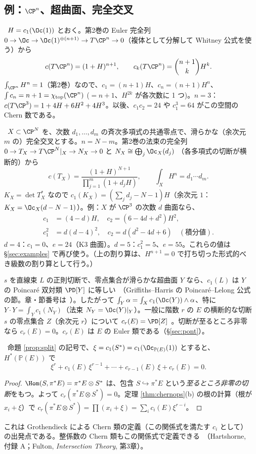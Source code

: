 \subsection{例：$\CP^n$、超曲面、完全交叉}
\begin{ex}[$\CP^n$]\label{ex:chernPn}\tP\
$H=c_1(\Oc(1))$ とおく。第2巻の Euler 完全列 $0\to\Oc\to\Oc(1)^{\oplus(n+1)}\to T\CP^n\to0$（複体として分解して Whitney 公式を使う）から
\[
c(T\CP^n)=(1+H)^{n+1},\qquad c_k(T\CP^n)=\binom{n+1}{k}H^k.
\]
$\int_{\CP^n}H^n=1$（第2巻）なので、$c_1=(n+1)H$、$c_n=(n+1)H^n$、$\int c_n=n+1=\chi_{\rm top}(\CP^n)$ ($=n+1$、$H^{2k}$ が各次数に 1 つ)。$n=3$：$c(T\CP^3)=1+4H+6H^2+4H^3$。以後、$c_1c_2=24$ や $c_1^3=64$ がこの空間の Chern 数である。
\end{ex}
\begin{ex}[超曲面と完全交叉]\label{ex:CI}\tP\
$X\subset\CP^N$ を、次数 $d_1,\dots,d_m$ の斉次多項式の共通零点で、滑らかな（余次元 $m$ の）完全交叉とする。$n=N-m$。第2巻の法束の完全列 $0\to T_X\to T\CP^N|_X\to N_{X}\to0$ と $N_X\cong\bigoplus_j\Oc_X(d_j)$ （各多項式の切断が横断的）から
\[
c(T_X)=\frac{(1+H)^{N+1}}{\prod_{j=1}^m(1+d_jH)},\qquad \int_XH^n=d_1\cdots d_m.
\]
$K_X=\det T_X^*$ なので $c_1(K_X)=(\sum_jd_j-N-1)H$（余次元 $1$：$K_X=\Oc_X(d-N-1)$）。例：$X$ が $\CP^3$ の次数 $d$ 曲面なら、
\begin{align*}
c_1&=(4-d)H,\quad c_2=(6-4d+d^2)H^2,\\
c_1^2&=d(d-4)^2,\quad c_2=d(d^2-4d+6)\quad(\text{積分値}).
\end{align*}
$d=4$：$c_1=0$、$e=24$（K3 曲面）。$d=5$：$c_1^2=5$、$e=55$。これらの値は \S\ref{sec:examples} で再び使う。（上の割り算は、$H^{n+1}=0$ で打ち切った形式的べき級数の割り算として行う。）
\end{ex}
\begin{rem}
$s$ を直線束 $L$ の正則切断で、零点集合が滑らかな超曲面 $Y$ なら、$c_1(L)$ は $Y$ の Poincaré 双対類 $\PD[Y]$ に等しい\tC\ （Griffiths--Harris の Poincaré--Lelong 公式の節。章・節番号は\tQ\ ）。したがって $\int_Y\alpha=\int_Xc_1(\Oc(Y))\wedge\alpha$、特に $Y\cdot Y=\int_Yc_1(N_Y)$（法束 $N_Y=\Oc(Y)|_Y$）。一般に階数 $r$ の $E$ の横断的な切断 $s$ の零点集合 $Z$（余次元 $r$）について $c_r(E)=\PD[Z]$\tC\ 。切断が至るところ非零なら $c_r(E)=0$。$c_r(E)$ は $E$ の Euler 類である（\S\ref{sec:pont}）。
\end{rem}
\begin{prop}[射影束の関係式]\label{prop:projrel}\tP\
命題 \ref{prop:split} の記号で、$\xi=c_1(S^*)=c_1(\Oc_{\mathbb P(E)}(1))$ とすると、$H^*(\mathbb P(E))$ で
\[
\xi^r+c_1(E)\,\xi^{r-1}+\cdots+c_{r-1}(E)\,\xi+c_r(E)=0.
\]
\end{prop}
\begin{proof}
$\Hom(S,\pi^*E)=\pi^*E\otimes S^*$ は、包含 $S\hookrightarrow\pi^*E$ という\emph{至るところ非零の切断}をもつ。よって $c_r(\pi^*E\otimes S^*)=0$。定理 \ref{thm:chernops}(b) の根の計算（根が $x_i+\xi$）で $c_r(\pi^*E\otimes S^*)=\prod(x_i+\xi)=\sum_ic_i(E)\xi^{r-i}$。
\end{proof}
\noindent これは Grothendieck による Chern 類の定義（この関係式を満たす $c_i$ として）の出発点である。整係数の Chern 類もこの関係式で定義できる\tC\ （Hartshorne, 付録 A；Fulton, \emph{Intersection Theory}, 第3章）。


